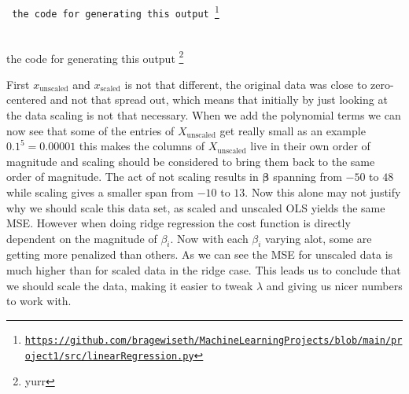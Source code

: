 \documentclass[twoside,11pt]{report}
\begin{document}
\begin{table}[!h]
\caption{Scaled sample design matrix fitting one-dimensional polynomial of degree 5}
\tt
\centering
{}\\
{\scriptsize
the code for generating this output }\footnote{\url{https://github.com/bragewiseth/MachineLearningProjects/blob/main/project1/src/linearRegression.py}\cite{MachineLearningProjects_2023}}
\end{table}



\begin{table}[h]
\centering
{}\\
{\scriptsize
the code for generating this output }\footnote{yurr}
\end{table}


First $x_{\text{unscaled}}$ and $x_{\text{scaled}}$ is not that different, the original data was close to zero-centered and not that spread out, which means that initially by just looking at the data scaling is not that necessary. When we add the polynomial terms we can now see that some of the entries of $X_{\text{unscaled}}$ get really small as an example $0.1^5 = 0.00001$ this makes the columns of $X_{\text{unscaled}}$ live in their own order of magnitude and scaling should be considered to bring them back to the same order of magnitude. The act of not scaling results in $\boldsymbol{\beta}$ spanning from $-50$ to $48$ while scaling gives a smaller span from $-10$ to $13$. Now this alone may not justify why we should scale this data set, as scaled and unscaled OLS yields the same MSE. However when doing ridge regression the cost function is directly dependent on the magnitude of $\beta_i$. Now with each $\beta_i$ varying alot, some are getting more penalized than others. As we can see the MSE for unscaled data is much higher than for scaled data in the ridge case.
This leads us to conclude that we should scale the data, making it easier to tweak $\lambda$ and giving us nicer numbers to work with.
\end{document}
